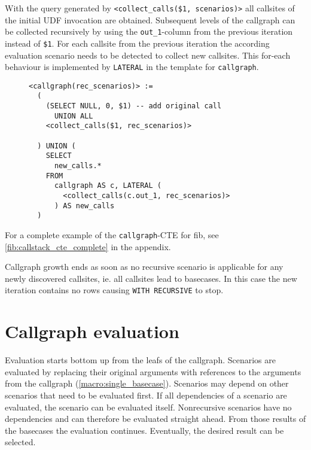 With the query generated by \texttt{<collect\_calls(\$1, scenarios)>} all callsites of the initial UDF invocation are obtained. Subsequent levels of the callgraph can be collected recursively by using the \texttt{out\_1}-column from the previous iteration instead of \texttt{\$1}. For each callsite from the previous iteration the according evaluation scenario needs to be detected to collect new callsites. This for-each behaviour is implemented by \texttt{LATERAL} in the template for \texttt{callgraph}.

\begin{figure}[h!]\centering
\begin{verbatim}
<callgraph(rec_scenarios)> :=
  (
    (SELECT NULL, 0, $1) -- add original call
      UNION ALL
    <collect_calls($1, rec_scenarios)> 

  ) UNION (
    SELECT
      new_calls.*
    FROM
      callgraph AS c, LATERAL (
        <collect_calls(c.out_1, rec_scenarios)>
      ) AS new_calls
  )
\end{verbatim}
  \caption{}
  \label{}
\end{figure}


\iffalse
\begin{figure}[h!]
    \centering
    
    \caption{Structure of the callstack CTE. In the beginning, the original parameters \$1 are used. The recursive step iterates over all newly discovered calls.}
    \label{discovery_strucutre}
\end{figure}
\fi

For a complete example of the \texttt{callgraph}-CTE for fib, see \autoref{fib:callstack_cte_complete} in the appendix.

Callgraph growth ends as soon as no recursive scenario is applicable for any newly discovered callsites, ie. all callsites lead to basecases. In this case the new iteration contains no rows causing \texttt{WITH RECURSIVE} to stop.

\section{Callgraph evaluation}
Evaluation starts bottom up from the leafs of the callgraph. Scenarios are evaluated by replacing their original arguments with references to the arguments from the callgraph (\autoref{macro:single_basecase}). Scenarios may depend on other scenarios that need to be evaluated first. If all dependencies of a scenario are evaluated, the scenario can be evaluated itself. Nonrecursive scenarios have no dependencies and can therefore be evaluated straight ahead. From those results of the basecases the evaluation continues. Eventually, the desired result can be selected.

